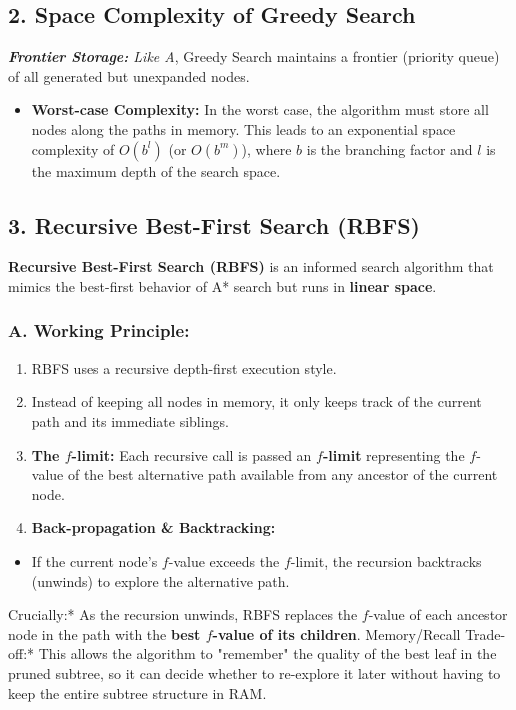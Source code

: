 \subsection{2. Space Complexity of Greedy Search}
\textit{   \textbf{Frontier Storage:} Like A}, Greedy Search maintains a frontier (priority queue) of all generated but unexpanded nodes.
\begin{itemize}
  \item   \textbf{Worst-case Complexity:} In the worst case, the algorithm must store all nodes along the paths in memory. This leads to an exponential space complexity of \textbf{$O(b^l)$} (or $O(b^m)$), where $b$ is the branching factor and $l$ is the maximum depth of the search space.
\end{itemize}

\subsection{3. Recursive Best-First Search (RBFS)}
\textbf{Recursive Best-First Search (RBFS)} is an informed search algorithm that mimics the best-first behavior of A* search but runs in \textbf{linear space}.

\subsubsection{A. Working Principle:}
\begin{enumerate}
  \item RBFS uses a recursive depth-first execution style.
  \item Instead of keeping all nodes in memory, it only keeps track of the current path and its immediate siblings.
  \item \textbf{The $f$-limit:} Each recursive call is passed an \textbf{$f$-limit} representing the $f$-value of the best alternative path available from any ancestor of the current node.
  \item \textbf{Back-propagation \& Backtracking:}
\end{enumerate}
\begin{itemize}
  \item   If the current node's $f$-value exceeds the $f$-limit, the recursion backtracks (unwinds) to explore the alternative path.
\end{itemize}
    \textit{   }Crucially:* As the recursion unwinds, RBFS replaces the $f$-value of each ancestor node in the path with the \textbf{best $f$-value of its children}.
    \textit{   }Memory/Recall Trade-off:* This allows the algorithm to "remember" the quality of the best leaf in the pruned subtree, so it can decide whether to re-explore it later without having to keep the entire subtree structure in RAM.

